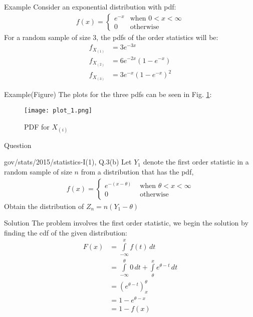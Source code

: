 \documentclass{beamer}
\providecommand{\brak}[1]{\ensuremath{\left(#1\right)}}
\begin{document}
\begin{frame}{Example}
    Consider an exponential distribution with pdf:
    \begin{align}
        f(x) = \begin{cases}
        e^{-x} &\text{when } 0<x<\infty\\
        0 &\text{otherwise}
        \end{cases}
    \end{align}
    For a random sample of size $3$, the pdfs of the order statistics will be:
    \begin{align}
        f_{X_{(1)}}&=3e^{-3x}\\
        f_{X_{(2)}}&=6e^{-2x}\brak{1-e^{-x}}\\
        f_{X_{(3)}}&=3e^{-x}\brak{1-e^{-x}}^{2}
    \end{align}
\end{frame}
\begin{frame}{Example(Figure)}
The plots for the three pdfs can be seen in Fig. \ref{fig:plot}:
    \begin{figure}
        \centering
        \texttt{[image: plot\_1.png]}
        \caption{PDF for $X_{(i)}$}
        \label{fig:plot}
    \end{figure}
    
\end{frame}
\begin{frame}{Question}
\begin{block}{gov/stats/2015/statistics-I(1), Q.3(b)}
    Let $Y_1$ denote the first order statistic in a random sample of size $n$ from a distribution that has the pdf, 
    \begin{align}
        f(x) = \nonumber
        \begin{cases}
        e^{-(x-\theta)}&\text{ when } \theta<x<\infty\\
        0 &\text{  otherwise} 
        \end{cases}
    \end{align}
Obtain the distribution of $Z_n = n(Y_1 - \theta)$\\
\end{block}
\end{frame}
\begin{frame}{Solution}
    The problem involves the first order statistic, we begin the solution by finding the cdf of the given distribution:
    \begin{align}
        F(x) &=\displaystyle\int\limits_{-\infty}^{x} f(t) \,dt\\
        &= \displaystyle\int\limits_{-\infty}^{\theta}0\,dt + \displaystyle\int\limits_{\theta}^{x}e^{\theta-t}\,dt\\
        &=\brak{e^{\theta-t}}_{x}^{\theta}\\
        &= 1-e^{\theta-x} \\
        &= 1-f(x) \label{eq_2}
    \end{align}
\end{frame}
\end{document}
